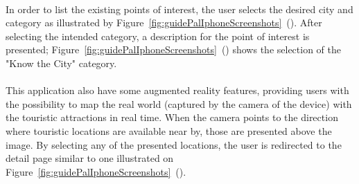 \\
In order to list the existing points of interest, the user selects the desired city and category as illustrated by  Figure~\ref{fig:guidePalIphoneScreenshots}~(). After selecting the intended category, a description for the point of interest is presented; Figure~\ref{fig:guidePalIphoneScreenshots}~() shows the selection of the "Know the City" category.\\
\\
This application also have some augmented reality features, providing users with the possibility to map the real world (captured by the camera of the device) with the touristic attractions in real time. When the camera points to the direction where touristic locations are available near by, those are presented above the image. By selecting any of the presented locations, the user is redirected to the detail page similar to one illustrated on Figure~\ref{fig:guidePalIphoneScreenshots}~().
